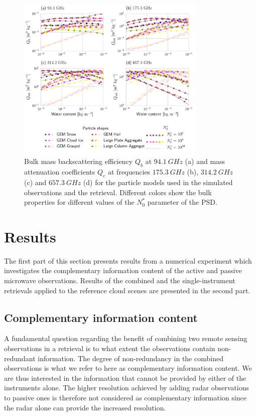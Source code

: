 \documentclass[journal abbreviation, manuscript]{copernicus}
\begin{document}
\begin{figure}
  \centering
  \includegraphics[width=0.8\textwidth]{../plots/particle_properties_d14}
  \caption{Bulk mass backscattering efficiency $Q_b$ at $94.1\ \unit{GHz}$ (a)
    and mass attenuation coefficients $Q_{e}$ at frequencies $175.3\ \unit{GHz}$
    (b), $314.2\ \unit{GHz}$ (c) and $657.3\ \unit{GHz}$ (d) for the particle
    models used in the simulated observations and the retrieval. Different
    colors show the bulk properties for different values of the $N_0^*$
    parameter of the PSD.}
  \label{fig:particle_properties}
\end{figure}

\section{Results}
\label{sec:results}

The first part of this section presents results from a numerical experiment
which investigates the complementary information content of the active and
passive microwave observations. Results of the combined and the
single-instrument retrievals applied to the reference cloud scenes are presented
in the second part.

\subsection{Complementary information content}
\label{sec:simple_cloud}

A fundamental question regarding the benefit of combining two remote sensing
observations in a retrieval is to what extent the observations contain
non-redundant information. The degree of non-redundancy in the combined
observations is what we refer to here as complementary information content. We
are thus interested in the information that cannot be provided by either of the
instruments alone. The higher resolution achieved by adding radar observations
to passive ones is therefore not considered as complementary information since
the radar alone can provide the increased resolution.
\end{document}

